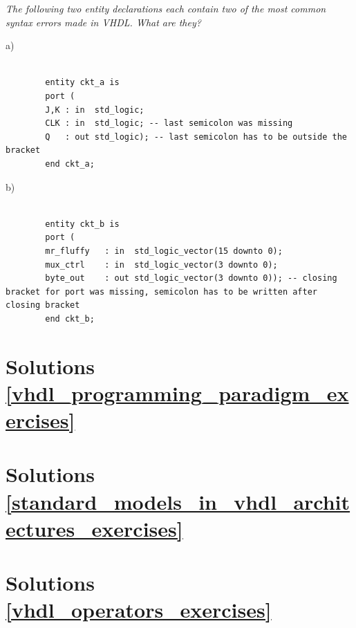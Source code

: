 \begin{my_num_list}
	\item \textit{The following two entity declarations each contain two of the most common syntax errors made in VHDL. What are they?}

	\noindent
	\begin{minipage}{1\linewidth}
		a)
		\begin{lstlisting}[]

		entity ckt_a is
		port (
		J,K : in  std_logic;
		CLK : in  std_logic; -- last semicolon was missing
		Q   : out std_logic); -- last semicolon has to be outside the bracket
		end ckt_a;
		\end{lstlisting}
	\end{minipage}

	\noindent
	\begin{minipage}{1\linewidth}
		b)
		\begin{lstlisting}[]

		entity ckt_b is
		port (
		mr_fluffy   : in  std_logic_vector(15 downto 0);
		mux_ctrl    : in  std_logic_vector(3 downto 0);
		byte_out    : out std_logic_vector(3 downto 0)); -- closing bracket for port was missing, semicolon has to be written after closing bracket
		end ckt_b;
		\end{lstlisting}
	\end{minipage}

\end{my_num_list}

\section{Solutions \ref{vhdl_programming_paradigm_exercises}~}

\section{Solutions \ref{standard_models_in_vhdl_architectures_exercises}~}

\section{Solutions \ref{vhdl_operators_exercises}~}

